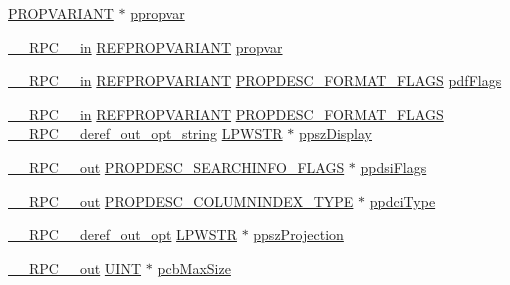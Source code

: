 \begin{DoxyCompactItemize}
\item 
\hyperlink{propidl_8h_ae902c1757cd16052896846fa4ebb88d8}{P\+R\+O\+P\+V\+A\+R\+I\+A\+NT} $\ast$ \hyperlink{struct_i_property_description_search_info_vtbl_a5b4e61541621e71e520add1f26227374}{ppropvar}
\item 
\hyperlink{rpcsal_8h_a20b7f6da600a05c8b541659f14f7f0e6}{\+\_\+\+\_\+\+R\+P\+C\+\_\+\+\_\+in} \hyperlink{propidl_8h_ac8a8bd0f5f7f9b7e9f8e6fd4fd039fda}{R\+E\+F\+P\+R\+O\+P\+V\+A\+R\+I\+A\+NT} \hyperlink{struct_i_property_description_search_info_vtbl_a175b16b21894c44e75c3caaa500cd7d4}{propvar}
\item 
\hyperlink{rpcsal_8h_a20b7f6da600a05c8b541659f14f7f0e6}{\+\_\+\+\_\+\+R\+P\+C\+\_\+\+\_\+in} \hyperlink{propidl_8h_ac8a8bd0f5f7f9b7e9f8e6fd4fd039fda}{R\+E\+F\+P\+R\+O\+P\+V\+A\+R\+I\+A\+NT} \hyperlink{propsys_8h_a2aebc32bcab5d49a6377d14902ec66e2}{P\+R\+O\+P\+D\+E\+S\+C\+\_\+\+F\+O\+R\+M\+A\+T\+\_\+\+F\+L\+A\+GS} \hyperlink{struct_i_property_description_search_info_vtbl_adb1ff8cdd1cfcf123f410a76faa9c21f}{pdf\+Flags}
\item 
\hyperlink{rpcsal_8h_a20b7f6da600a05c8b541659f14f7f0e6}{\+\_\+\+\_\+\+R\+P\+C\+\_\+\+\_\+in} \hyperlink{propidl_8h_ac8a8bd0f5f7f9b7e9f8e6fd4fd039fda}{R\+E\+F\+P\+R\+O\+P\+V\+A\+R\+I\+A\+NT} \hyperlink{propsys_8h_a2aebc32bcab5d49a6377d14902ec66e2}{P\+R\+O\+P\+D\+E\+S\+C\+\_\+\+F\+O\+R\+M\+A\+T\+\_\+\+F\+L\+A\+GS} \hyperlink{rpcsal_8h_a8117c8d086bbc250c5117e81dc347263}{\+\_\+\+\_\+\+R\+P\+C\+\_\+\+\_\+deref\+\_\+out\+\_\+opt\+\_\+string} \hyperlink{mapinls_8h_acc28f72b93422cfd63a60e5a102a77b1}{L\+P\+W\+S\+TR} $\ast$ \hyperlink{struct_i_property_description_search_info_vtbl_a1c6e91b3f810e188be9bb69dc22a935b}{ppsz\+Display}
\item 
\hyperlink{rpcsal_8h_aa518a2c78d44d75f3685c32c455c5ed8}{\+\_\+\+\_\+\+R\+P\+C\+\_\+\+\_\+out} \hyperlink{propsys_8h_a9b942929db3fb34b2a1d7264677e7ddd}{P\+R\+O\+P\+D\+E\+S\+C\+\_\+\+S\+E\+A\+R\+C\+H\+I\+N\+F\+O\+\_\+\+F\+L\+A\+GS} $\ast$ \hyperlink{struct_i_property_description_search_info_vtbl_a282d7c2e32b252001203ed93698d70b6}{ppdsi\+Flags}
\item 
\hyperlink{rpcsal_8h_aa518a2c78d44d75f3685c32c455c5ed8}{\+\_\+\+\_\+\+R\+P\+C\+\_\+\+\_\+out} \hyperlink{propsys_8h_aa58a6b502f990244bca258a7586266dc}{P\+R\+O\+P\+D\+E\+S\+C\+\_\+\+C\+O\+L\+U\+M\+N\+I\+N\+D\+E\+X\+\_\+\+T\+Y\+PE} $\ast$ \hyperlink{struct_i_property_description_search_info_vtbl_aae176da4cccadf20e8779e5fc50584ce}{ppdci\+Type}
\item 
\hyperlink{rpcsal_8h_ab29e89ceb0eb0b075c6f6299b0de6a21}{\+\_\+\+\_\+\+R\+P\+C\+\_\+\+\_\+deref\+\_\+out\+\_\+opt} \hyperlink{mapinls_8h_acc28f72b93422cfd63a60e5a102a77b1}{L\+P\+W\+S\+TR} $\ast$ \hyperlink{struct_i_property_description_search_info_vtbl_a14a831280dfa674c055c0be852d05505}{ppsz\+Projection}
\item 
\hyperlink{rpcsal_8h_aa518a2c78d44d75f3685c32c455c5ed8}{\+\_\+\+\_\+\+R\+P\+C\+\_\+\+\_\+out} \hyperlink{mapinls_8h_a36cb3b01d81ffd844bbbfb54003e06ec}{U\+I\+NT} $\ast$ \hyperlink{struct_i_property_description_search_info_vtbl_a69463c772e84fdbf49199f282f7cb3a6}{pcb\+Max\+Size}
\end{DoxyCompactItemize}


